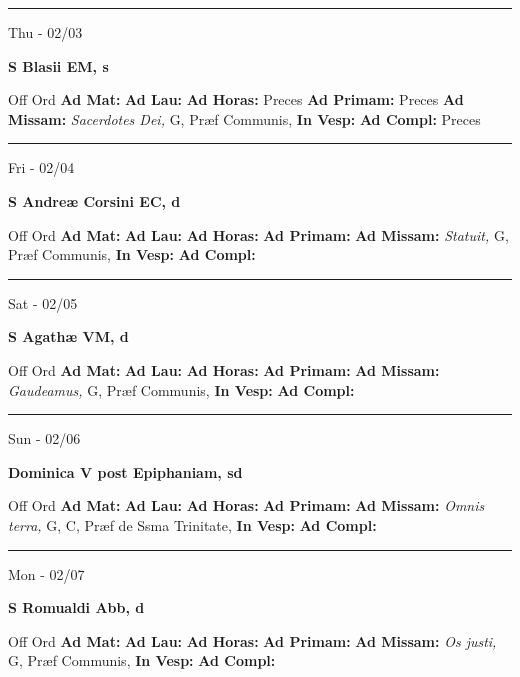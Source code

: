 \documentclass[letterpaper, 10pt]{article}
\begin{document}
\hrule
\begin{center}
Thu - 02/03
\end{center}\textbf{ \large S Blasii EM, \textnormal{\normalsize s}}
\begin{justify}
Off Ord
\textbf{Ad Mat: }
\textbf{Ad Lau: }
\textbf{Ad Horas: }Preces
\textbf{Ad Primam: }Preces
\textbf{Ad Missam:} \textit{Sacerdotes Dei, } G, Præf Communis, 
\textbf{In Vesp: }
\textbf{Ad Compl: }Preces\end{justify}



\hrule
\begin{center}
Fri - 02/04
\end{center}\textbf{ \large S Andreæ Corsini EC, \textnormal{\normalsize d}}
\begin{justify}
Off Ord
\textbf{Ad Mat: }
\textbf{Ad Lau: }
\textbf{Ad Horas: }
\textbf{Ad Primam: }
\textbf{Ad Missam:} \textit{Statuit, } G, Præf Communis, 
\textbf{In Vesp: }
\textbf{Ad Compl: }\end{justify}



\hrule
\begin{center}
Sat - 02/05
\end{center}\textbf{ \large S Agathæ VM, \textnormal{\normalsize d}}
\begin{justify}
Off Ord
\textbf{Ad Mat: }
\textbf{Ad Lau: }
\textbf{Ad Horas: }
\textbf{Ad Primam: }
\textbf{Ad Missam:} \textit{Gaudeamus, } G, Præf Communis, 
\textbf{In Vesp: }
\textbf{Ad Compl: }\end{justify}



\hrule
\begin{center}
Sun - 02/06
\end{center}\textbf{ \large Dominica V post Epiphaniam, \textnormal{\normalsize sd}}
\begin{justify}
Off Ord
\textbf{Ad Mat: }
\textbf{Ad Lau: }
\textbf{Ad Horas: }
\textbf{Ad Primam: }
\textbf{Ad Missam:} \textit{Omnis terra, } G, C, Præf de Ssma Trinitate, 
\textbf{In Vesp: }
\textbf{Ad Compl: }\end{justify}



\hrule
\begin{center}
Mon - 02/07
\end{center}\textbf{ \large S Romualdi Abb, \textnormal{\normalsize d}}
\begin{justify}
Off Ord
\textbf{Ad Mat: }
\textbf{Ad Lau: }
\textbf{Ad Horas: }
\textbf{Ad Primam: }
\textbf{Ad Missam:} \textit{Os justi, } G, Præf Communis, 
\textbf{In Vesp: }
\textbf{Ad Compl: }\end{justify}
\end{document}

